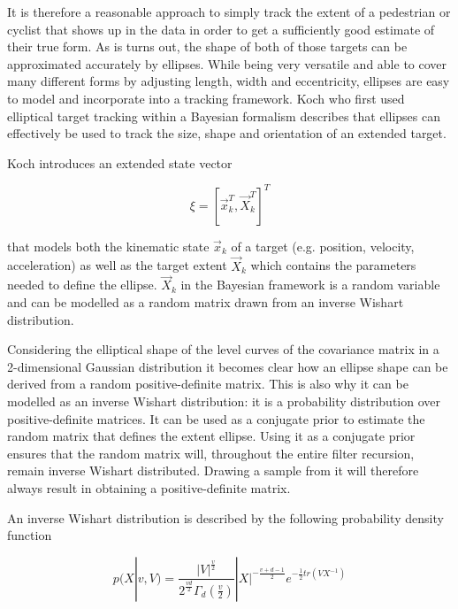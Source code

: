 It is therefore a reasonable approach to simply track the extent of a pedestrian or cyclist that shows up in the data in order to get a sufficiently good estimate of their true form. As is turns out, the shape of both of those targets can be approximated accurately by ellipses. While being very versatile and able to cover many different forms by adjusting length, width and eccentricity, ellipses are easy to model and incorporate into a tracking framework. Koch who first used elliptical target tracking within a Bayesian formalism describes that ellipses can effectively be used to track the size, shape and orientation of an extended target. \cite{koch2008elliptical}

Koch introduces an extended state vector 

\begin{equation}
    \xi = [\vec{x}_k^T, \vec{X}_k^T]^T
\end{equation}

that models both the kinematic state $\vec{x}_k$ of a target (e.g. position, velocity, acceleration) as well as the target extent $\vec{X}_k$ which contains the parameters needed to define the ellipse. $\vec{X}_k$ in the Bayesian framework is a random variable and can be modelled as a random matrix drawn from an inverse Wishart distribution. \cite{koch2008elliptical}

Considering the elliptical shape of the level curves of the covariance matrix in a 2-dimensional Gaussian distribution it becomes clear how an ellipse shape can be derived from a random positive-definite matrix. This is also why it can be modelled as an inverse Wishart distribution: it is a probability distribution over positive-definite matrices. It can be used as a conjugate prior to estimate the random matrix that defines the extent ellipse. \cite{barberBRML2014} Using it as a conjugate prior ensures that the random matrix will, throughout the entire filter recursion, remain inverse Wishart distributed. Drawing a sample from it will therefore always result in obtaining a positive-definite matrix. 

An inverse Wishart distribution is described by the following probability density function

\begin{equation}
    p(X|v,V) = \frac{|V|^\frac{v}{2}}{2^\frac{vd}{2}\Gamma_d(\frac{v}{2})}|X|^{-\frac{v+d-1}{2}}e^{-\frac{1}{2}tr(VX^{-1})}
\end{equation}

